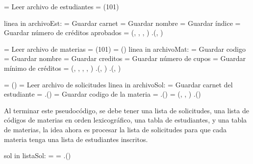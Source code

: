 \documentclass[11pt]{article}
\begin{document}
\begin{codebox}
   \li {} = Leer archivo de estudiantes
   \li {} =  (101)

   \li \For linea in archivoEst:
   \li \Do
       = Guardar carnet
      \li {} = Guardar nombre
      \li {} = Guardar índice
      \li {} = Guardar número de créditos aprobados
      \li {} =  (, , , )
      \li {}.(, )
      \End

   \li
   \li {} = Leer archivo de materias
   \li {} =  (101)
   \li {} =  ()
   \li \For linea in archivoMat:
   \li \Do
       = Guardar codigo
      \li {} = Guardar nombre
      \li {} = Guardar creditos
      \li {} = Guardar número de cupos
      \li {} = Guardar mínimo de créditos
      \li {} =  (, , , , )
      \li {}.(, )
      \li {}.(, )
      \End

   \li
   \li {} =  ()
   \li {} = Leer archivo de solicitudes
   \li \For linea in archivoSol:
   \li \Do
       = Guardar carnet del estudiante
      \li {} = .()
      \li {} = Guardar codigo de la materia
      \li {} = .()
      \li {} =  (, , )
      \li {}.() \label{li:Extraer-Datos-final}
      \End
   \End
   \end{codebox}

   Al terminar este pseudocódigo, se debe tener una lista de solicitudes,
   una lista de códigos de materias en orden lexicográfico, una tabla de
   estudiantes, y una tabla de materias, la idea ahora es procesar la lista
   de solicitudes para que cada materia tenga una lista de estudiantes inscritos.

   \begin{codebox}
      \li \For sol in listaSol:
      \Do
         \li {} = 
         \li {} = 
         \li {}.() \label{li:Procesar-Solicitudes-final}
         \End
      \End
   \end{codebox}
\end{document}
